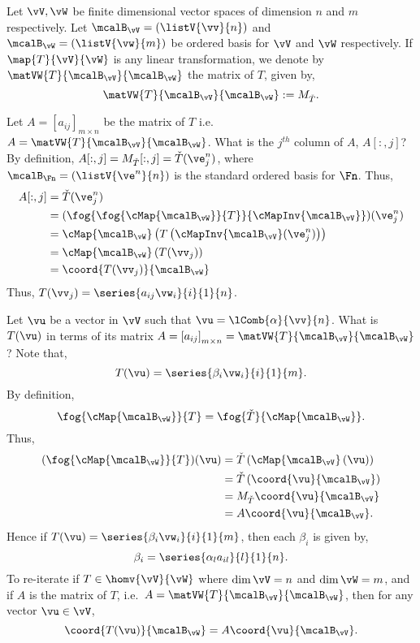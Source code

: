 
\begin{Definition}[name=Matrix]
    Let $\vV,\vW$ be finite dimensional vector spaces of dimension $n$ and $m$ respectively. Let 
    $\mcalB_{\vV} = \left(\listV{\vv}{n}\right)$ and $\mcalB_{\vW} = \left(\listV{\vw}{m}\right)$ 
    be ordered basis for $\vV$ and $\vW$ respectively.
    If $\map{T}{\vV}{\vW}$ is any linear transformation, we denote by $\matVW{T}{\mcalB_{\vV}}{\mcalB_{\vW}}$
    the matrix of $T$, given by,
    \[\matVW{T}{\mcalB_{\vV}}{\mcalB_{\vW}} := M_{\check{T}}.\]
\end{Definition}
Let $A = {[a_{ij}]}_{m\times n}$ be the matrix of $T$ i.e.~$A = \matVW{T}{\mcalB_{\vV}}{\mcalB_{\vW}}$. What
is the $j^{th}$ column of $A$, $A[:,j]$? By definition, $A[:,j] = M_{\check{T}}[:,j] =
\check{T}(\ve^{n}_{j})$, where $\mcalB_{\Fn} = \left(\listV{\ve^{n}}{n}\right)$ is the standard ordered basis
for $\Fn$.
Thus,
\begin{align*}
    A[:,j] &= \check{T}(\ve^{n}_{j})\\
    &= (\fog{\fog{\cMap{\mcalB_{\vW}}}{T}}{\cMapInv{\mcalB_{\vV}}})(\ve^{n}_{j}) \\
    &= \cMap{\mcalB_{\vW}}\left(T\left(\cMapInv{\mcalB_{\vV}}(\ve^{n}_{j})\right)\right)\\
    &= \cMap{\mcalB_{\vW}}\left(T(\vv_{j})\right) \\
    &= \coord{T(\vv_{j})}{\mcalB_{\vW}}
\end{align*}
Thus, $T(\vv_{j}) = \series{a_{ij}\vw_{i}}{i}{1}{n}$.

Let $\vu$ be a vector in $\vV$ such that $\vu = \lComb{\alpha}{\vv}{n}$. 
What is $T(\vu)$ in terms of its matrix 
$A = {[a_{ij}]}_{m\times n} = \matVW{T}{\mcalB_{\vV}}{\mcalB_{\vW}}$? Note that,
\[T(\vu) = \series{\beta_{i}\vw_{i}}{i}{1}{m}.\]
By definition,
\[\fog{\cMap{\mcalB_{\vW}}}{T} = \fog{\check{T}}{\cMap{\mcalB_{\vW}}}.\]
Thus,
\begin{align*}
    (\fog{\cMap{\mcalB_{\vW}}}{T})(\vu) & = \check{T}\left(\cMap{\mcalB_{\vV}}\left(\vu\right)\right)\\
    & = \check{T}\left(\coord{\vu}{\mcalB_{\vV}}\right)\\
    & = M_{\check{T}}\coord{\vu}{\mcalB_{\vV}}\\
    & = A\coord{\vu}{\mcalB_{\vV}}.
\end{align*}
Hence if $T(\vu) = \series{\beta_{i}\vw_{i}}{i}{1}{m}$, then each $\beta_{i}$ is given by,
\[\beta_i = \series{\alpha_{l}a_{il}}{l}{1}{n}.\]
To re-iterate if $T\in \homv{\vV}{\vW}$ where $\dim{\vV} = n$ and $\dim{\vW} = m$, and if $A$ is the matrix of
$T$, i.e.~$A = \matVW{T}{\mcalB_{\vV}}{\mcalB_{\vW}}$, then for any vector $\vu \in \vV$,
\[\coord{T(\vu)}{\mcalB_{\vW}} = A\coord{\vu}{\mcalB_{\vV}}.\]


